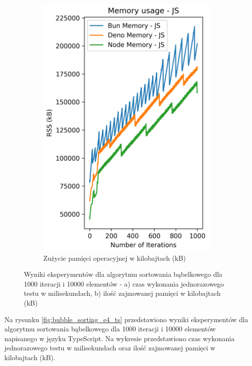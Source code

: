 \begin{figure}[H]
\begin{subfigure}[b]{0.4\textwidth}
    \includegraphics[width=\textwidth]{Figures/sorting/sorting_bubble_1000_10000_js_memory.png}
    \caption{Zużycie pamięci operacyjnej w kilobajtach (kB)}
    \label{fig:bubble_sorting_e4_memory}
  \end{subfigure}
  \caption{Wyniki eksperymentów dla algorytmu sortowania bąbelkowego dla 1000 iteracji i 10000 elementów - a) czas wykonania jednorazowego testu w milisekundach, b) ilość zajmowanej pamięci w kilobajtach (kB)}
  \label{fig:bubble_sorting_e4}
\end{figure}

Na rysunku \ref{fig:bubble_sorting_e4_ts} przedstawiono wyniki eksperymentów dla algorytmu sortowania bąbelkowego dla 1000 iteracji i 10000 elementów napisanego w języku TypeScript. Na wykresie przedstawiono czas wykonania jednorazowego testu w milisekundach oraz ilość zajmowanej pamięci w kilobajtach (kB).

